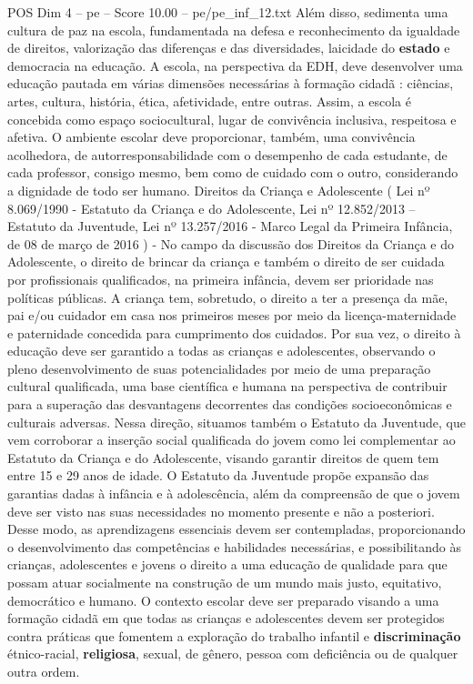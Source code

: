 \begin{textsample}{POS Dim 4 – pe – Score 10.00 – pe/pe\_inf\_12.txt}
Além disso, sedimenta uma cultura de paz na escola, fundamentada na defesa e reconhecimento da igualdade de direitos, valorização das diferenças e das diversidades, laicidade do \textbf{estado} e democracia na educação.
A escola, na perspectiva da EDH, deve desenvolver uma educação pautada em várias dimensões necessárias à formação cidadã : ciências, artes, cultura, história, ética, afetividade, entre outras.
Assim, a escola é concebida como espaço sociocultural, lugar de convivência inclusiva, respeitosa e afetiva.
O ambiente escolar deve proporcionar, também, uma convivência acolhedora, de autorresponsabilidade com o desempenho de cada estudante, de cada professor, consigo mesmo, bem como de cuidado com o outro, considerando a dignidade de todo ser humano.
Direitos da Criança e Adolescente ( Lei nº 8.069/1990 - Estatuto da Criança e do Adolescente, Lei nº 12.852/2013 – Estatuto da Juventude, Lei nº 13.257/2016 - Marco Legal da Primeira Infância, de 08 de março de 2016 ) - No campo da discussão dos Direitos da Criança e do Adolescente, o direito de brincar da criança e também o direito de ser cuidada por profissionais qualificados, na primeira infância, devem ser prioridade nas políticas públicas.
A criança tem, sobretudo, o direito a ter a presença da mãe, pai e/ou cuidador em casa nos primeiros meses por meio da licença-maternidade e paternidade concedida para cumprimento dos cuidados.
Por sua vez, o direito à educação deve ser garantido a todas as crianças e adolescentes, observando o pleno desenvolvimento de suas potencialidades por meio de uma preparação cultural qualificada, uma base científica e humana na perspectiva de contribuir para a superação das desvantagens decorrentes das condições socioeconômicas e culturais adversas.
Nessa direção, situamos também o Estatuto da Juventude, que vem corroborar a inserção social qualificada do jovem como lei complementar ao Estatuto da Criança e do Adolescente, visando garantir direitos de quem tem entre 15 e 29 anos de idade.
O Estatuto da Juventude propõe expansão das garantias dadas à infância e à adolescência, além da compreensão de que o jovem deve ser visto nas suas necessidades no momento presente e não a posteriori.
Desse modo, as aprendizagens essenciais devem ser contempladas, proporcionando o desenvolvimento das competências e habilidades necessárias, e possibilitando às crianças, adolescentes e jovens o direito a uma educação de qualidade para que possam atuar socialmente na construção de um mundo mais justo, equitativo, democrático e humano.
O contexto escolar deve ser preparado visando a uma formação cidadã em que todas as crianças e adolescentes devem ser protegidos contra práticas que fomentem a exploração do trabalho infantil e \textbf{discriminação} étnico-racial, \textbf{religiosa}, sexual, de gênero, pessoa com deficiência ou de qualquer outra ordem.

\end{textsample}

